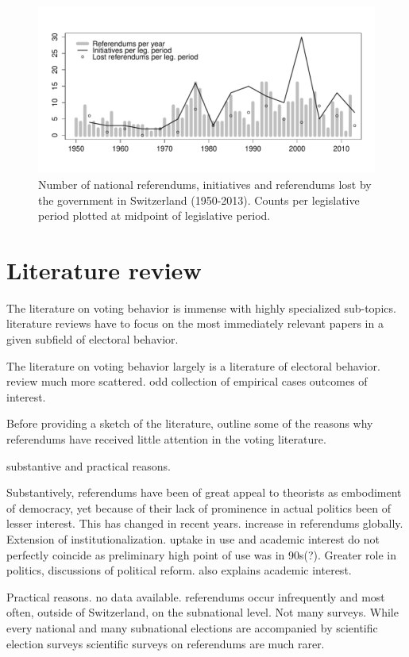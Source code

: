 \documentclass[11pt,a4paper]{article}
\begin{document}
\begin{figure}[htb]
\includegraphics[width=\textwidth]{../../figures/figure.pdf}    
\caption{Number of national referendums, initiatives and referendums lost by the government in Switzerland (1950-2013). Counts per legislative period plotted at midpoint of legislative period.}\label{fig}
\end{figure}

\section{Literature review}\label{sec:litreview}

	The literature on voting behavior is immense with highly specialized sub-topics. literature reviews have to focus on the most immediately relevant papers in a given subfield of electoral behavior. 
	
	The literature on voting behavior largely is a literature of electoral behavior. review much more scattered. odd collection of empirical cases outcomes of interest.
	
	Before providing a sketch of the literature, outline some of the reasons why referendums have received little attention in the voting literature. 
	
	substantive and practical reasons.
	
	Substantively, referendums have been of great appeal to theorists as embodiment of democracy, yet because of their lack of prominence in actual politics been of lesser interest. This has changed in recent years. increase in referendums globally. Extension of institutionalization. uptake in use and academic interest do not perfectly coincide as preliminary high point of use was in 90s(?). Greater role in politics, discussions of political reform. also explains academic interest.
		
	Practical reasons. no data available. referendums occur infrequently and most often, outside of Switzerland, on the subnational level. Not many surveys. While every national and many subnational elections are accompanied by scientific election surveys scientific surveys on referendums are much rarer. 
	
\end{document}
